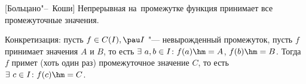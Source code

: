 [Больцано"--~Коши]\label{bk}
Непрерывная на~промежутке функция принимает все промежуточные значения.

Конкретизация: пусть $f\in C(I),\pau I$ "--- невырожденный промежуток, пусть $f$ принимает значения $A$ и $B$, то есть
$\exists\  a,b\in I\colon f(a)\hm=A$, $f(b)\hm=B$. Тогда $f$ примет (хоть один раз) промежуточное значение $C$, то есть $\exists\  c\in I\colon
f(c)\hm=C$.

